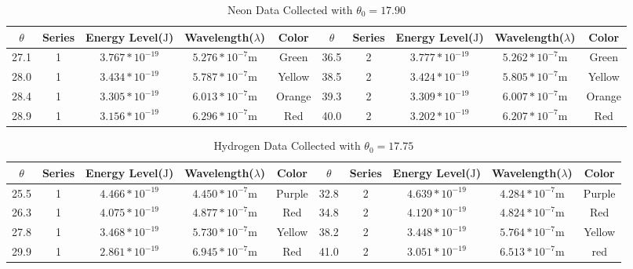 \documentclass{article}
\begin{document}
    \begin{longtable}[c]{|c c c c c || c c c c c|}
        \caption{Neon Data Collected with $\theta_{0} = 17.90$ \label{long}}\\
        \hline
        $\theta$ & Series & Energy Level($\si{\joule}$) & Wavelength($\lambda$) & Color & $\theta$ & Series & Energy Level($\si{\joule}$) & Wavelength($\lambda$) & Color\\
        \hline
        27.1 & 1 & $3.767 * 10^{-19}$ & $5.276 * 10^{-7} \si{\metre}$ & Green & 36.5 & 2 & $3.777 * 10^{-19}$ & $5.262 * 10^{-7} \si{\metre}$ & Green\\
        28.0 & 1 & $3.434 * 10^{-19}$ & $5.787 * 10^{-7} \si{\metre}$ & Yellow & 38.5 & 2 & $3.424 * 10^{-19}$ & $5.805 * 10^{-7} \si{\metre}$  & Yellow\\
        28.4 & 1 & $3.305 * 10^{-19}$ & $6.013 * 10^{-7} \si{\metre}$ & Orange & 39.3 & 2 & $3.309 * 10^{-19}$ & $6.007 * 10^{-7} \si{\metre}$ & Orange\\
        28.9 & 1 & $3.156 * 10^{-19}$ & $6.296 * 10^{-7} \si{\metre}$ & Red & 40.0 & 2 & $3.202 * 10^{-19}$ & $6.207 * 10^{-7} \si{\metre}$ & Red\\
        \hline
    \end{longtable}
    \begin{longtable}[c]{|c c c c c|| c c c c c|}
        \caption{Hydrogen Data Collected with $\theta_{0} = 17.75$ \label{long}}\\
        \hline
        $\theta$ & Series & Energy Level($\si{\joule}$) & Wavelength($\lambda$) & Color & $\theta$ & Series & Energy Level($\si{\joule}$) & Wavelength($\lambda$) & Color\\
        \hline
        25.5 & 1 & $4.466 * 10^{-19}$ & $4.450 * 10^{-7} \si{\metre}$ & Purple & 32.8 & 2 & $4.639 * 10^{-19}$ & $4.284 * 10^{-7} \si{\metre}$ & Purple\\
        26.3 & 1 & $4.075 * 10^{-19}$ & $4.877 * 10^{-7} \si{\metre}$ & Red & 34.8 & 2 & $4.120 * 10^{-19}$ & $4.824 * 10^{-7} \si{\metre}$ & Red\\
        27.8 & 1 & $3.468 * 10^{-19}$ & $5.730 * 10^{-7} \si{\metre}$ & Yellow & 38.2 & 2 & $3.448 * 10^{-19}$ & $5.764 * 10^{-7} \si{\metre}$ & Yellow\\
        29.9 & 1 & $2.861 * 10^{-19}$ & $6.945 * 10^{-7} \si{\metre}$ & Red & 41.0 & 2 & $3.051 * 10^{-19}$ & $6.513 * 10^{-7} \si{\metre}$ & red\\
        \hline
    \end{longtable}
\end{document}
